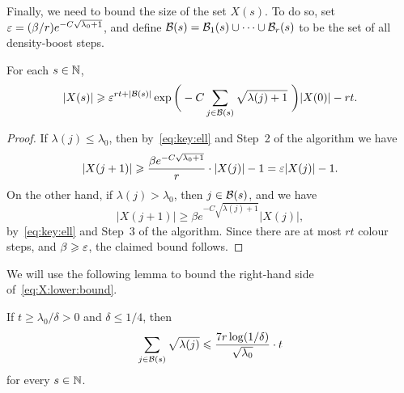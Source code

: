 Finally, we need to bound the size of the set $X(s)$. To do so, set $\varepsilon = (\beta / r) e^{- C \sqrt{\lambda_0 + 1}}$, and define $\mathcal{B}(s) = \mathcal{B}_1(s) \cup \cdots \cup \mathcal{B}_r(s)$ to be the set of all density-boost steps. 

\begin{lemma}\label{lem:X:lower:bound}
  For each $s \in \mathbb{N}$, 
  \begin{equation}\label{eq:X:lower:bound}
  |X(s)| \geqslant \varepsilon^{rt + |\mathcal{B}(s)|} \exp\bigg( - C \sum_{j \in \mathcal{B}(s)} \sqrt{\lambda(j)+1}\,\, \bigg) |X(0)| - rt.
  \end{equation}
\end{lemma}

\begin{proof}
  If $\lambda(j) \le \lambda_0$, then by~\eqref{eq:key:ell} and Step~2 of the algorithm we have
  $$|X(j+1)| \geqslant \frac{\beta e^{- C \sqrt{\lambda_0 + 1}}}{r} \cdot |X(j)| - 1 = \varepsilon |X(j)| - 1.$$ 
  On the other hand, if $\lambda(j) > \lambda_0$, then $j \in \mathcal{B}(s)$, and we have 
  $$|X(j+1)| \ge \beta e^{- C \sqrt{\lambda(j) + 1}} |X(j)|,$$ 
  by~\eqref{eq:key:ell} and Step~3 of the algorithm. Since there are at most $rt$ colour steps, and $\beta \geqslant \varepsilon$, the claimed bound follows.
\end{proof}

We will use the following lemma to bound the right-hand side of~\eqref{eq:X:lower:bound}. 

\begin{lemma}\label{lem:sum:of:lambdas}
  If\/ $t \ge \lambda_0 / \delta > 0$ and\/ $\delta \le 1/4$, then
  $$\sum_{j \in \mathcal{B}(s)} \sqrt{\lambda(j)} \leqslant \frac{7r \log(1/\delta)}{\sqrt{\lambda_0}} \cdot t$$
  for every $s \in \mathbb{N}$. 
\end{lemma}

